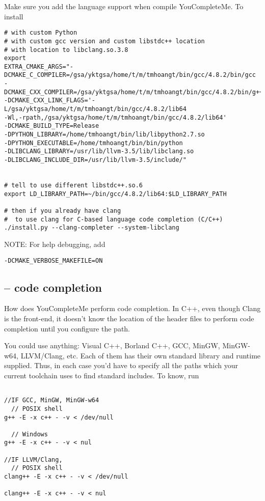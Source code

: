 Make sure you add the language support when compile YouCompleteMe.
% 
To install
\begin{verbatim}
# with custom Python
# with custom gcc version and custom libstdc++ location
# with location to libclang.so.3.8
export
EXTRA_CMAKE_ARGS="-DCMAKE_C_COMPILER=/gsa/yktgsa/home/t/m/tmhoangt/bin/gcc/4.8.2/bin/gcc
-DCMAKE_CXX_COMPILER=/gsa/yktgsa/home/t/m/tmhoangt/bin/gcc/4.8.2/bin/g++
-DCMAKE_CXX_LINK_FLAGS='-L/gsa/yktgsa/home/t/m/tmhoangt/bin/gcc/4.8.2/lib64
-Wl,-rpath,/gsa/yktgsa/home/t/m/tmhoangt/bin/gcc/4.8.2/lib64'
-DCMAKE_BUILD_TYPE=Release
-DPYTHON_LIBRARY=/home/tmhoangt/bin/lib/libpython2.7.so
-DPYTHON_EXECUTABLE=/home/tmhoangt/bin/bin/python
-DLIBCLANG_LIBRARY=/usr/lib/llvm-3.5/lib/libclang.so
-DLIBCLANG_INCLUDE_DIR=/usr/lib/llvm-3.5/include/"
 

# tell to use different libstdc++.so.6
export LD_LIBRARY_PATH=~/bin/gcc/4.8.2/lib64:$LD_LIBRARY_PATH

# then if you already have clang
#  to use clang for C-based language code completion (C/C++)
./install.py --clang-completer --system-libclang
\end{verbatim}

NOTE: For help debugging, add
\begin{verbatim}
-DCMAKE_VERBOSE_MAKEFILE=ON
\end{verbatim}

\subsection{-- code completion}

How does YouCompleteMe perform code completion.
In C++, even though Clang is the front-end, it doesn't know the location of the
header files to perform code completion until you configure the path.

You could use anything: Visual C++, Borland C++, GCC, MinGW, MinGW-w64,
LLVM/Clang, etc. Each of them has their own standard library and runtime
supplied. Thus, in each case you'd have to specify all the paths which your
current toolchain uses to find standard includes.
To know, run
\begin{verbatim}

//IF GCC, MinGW, MinGW-w64
  // POSIX shell
g++ -E -x c++ - -v < /dev/null

  // Windows
g++ -E -x c++ - -v < nul

//IF LLVM/Clang,
  // POSIX shell
clang++ -E -x c++ - -v < /dev/null

clang++ -E -x c++ - -v < nul
\end{verbatim}

